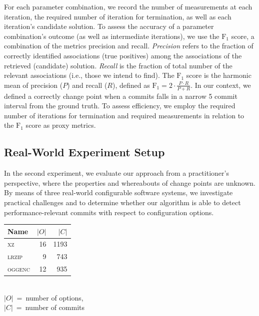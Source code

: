 \documentclass[sigconf]{acmart}
\begin{document}
	For each parameter combination, we record the number of measurements at each iteration, the required number of iteration for termination, as well as each iteration's candidate solution. To assess the accuracy of a parameter combination's outcome (as well as intermediate iterations), we use the $\text{F}_1$ score, a combination of the metrics precision and recall. \emph{Precision} refers to the fraction of correctly identified associations (true positives) among the associations of the retrieved (candidate) solution. \emph{Recall} is the fraction of total number of the relevant associations (i.e., those we intend to find). The $\text{F}_1$ score is the harmonic mean of precision ($P$) and recall ($R$), defined as $\text{F}_1 = 2\cdot\frac{P \cdot R}{P + R}$.	In our context, we defined a correctly change point when a commits falls in a narrow 5 commit interval from the ground truth.
	To assess efficiency, we employ the required number of iterations for termination and required measurements in relation to the $\text{F}_1$ score as proxy metrics.
	
	\subsection{Real-World Experiment Setup}
	In the second experiment, we evaluate our approach from a practitioner's perspective, where the properties and whereabouts of change points are unknown.  By means of three real-world configurable software systems, we investigate practical challenges and to determine whether our algorithm is able to detect performance-relevant commits with respect to configuration options. 

    \begin{table}
        \centering
        \label{tab:properties}
        \begin{tabular}{lrr}
			\toprule
			\textbf{Name} & \textbf{$\vert O\vert$} & \textbf{$\vert C\vert$}\\
			\midrule
			\textsc{xz} & 16 & 1193\\
			\textsc{lrzip} & 9 & 743 \\
			\textsc{oggenc} & 12 & 935\\
			\bottomrule
		\end{tabular}\\
		{\footnotesize $\vert O\vert$~=~number of options,\\ $\vert C\vert$~=~number of commits }
    \end{table}
\end{document}
